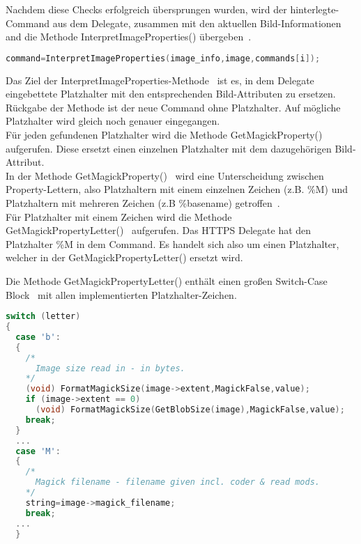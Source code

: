 Nachdem diese Checks erfolgreich übersprungen wurden, wird der hinterlegte-Command aus dem Delegate,
zusammen mit den aktuellen Bild-Informationen and die Methode InterpretImageProperties() übergeben~\cite{CallInterpretImageProperties}.

\begin{lstlisting}[firstnumber=1295, language=C, caption=magick/delegates.c InvokeDelegate() InterpretImageProperties() Aufruf,label={lst:delegatesinterpretcall}]
command=InterpretImageProperties(image_info,image,commands[i]);
\end{lstlisting}
\vspace{5mm}

Das Ziel der InterpretImageProperties-Methode~\cite{DeklarationInterpretImageProperties} ist es, in dem Delegate eingebettete Platzhalter mit den entsprechenden Bild-Attributen zu ersetzen.
Rückgabe der Methode ist der neue Command ohne Platzhalter.
Auf mögliche Platzhalter wird gleich noch genauer eingegangen.\\

Für jeden gefundenen Platzhalter wird die Methode GetMagickProperty()~\cite{CallGetMagickPrioerty} aufgerufen.
Diese ersetzt einen einzelnen Platzhalter mit dem dazugehörigen Bild-Attribut.\\

In der Methode GetMagickProperty()~\cite{DeklarationGetMagickProperty} wird eine Unterscheidung zwischen Property-Lettern,
also Platzhaltern mit einem einzelnen Zeichen (z.B. \%M) und Platzhaltern mit mehreren Zeichen (z.B \%basename) getroffen~\cite{UnterscheidungPropertyLetter}.\\

Für Platzhalter mit einem Zeichen wird die Methode GetMagickPropertyLetter()~\cite{DeklarationGetMgickPropertyLetter} aufgerufen.
Das HTTPS Delegate hat den Platzhalter \%M in dem Command.
Es handelt sich also um einen Platzhalter, welcher in der GetMagickPropertyLetter() ersetzt wird.\\

\newpage

Die Methode GetMagickPropertyLetter() enthält einen großen Switch-Case Block~\cite{SwitchBlock} mit allen implementierten Platzhalter-Zeichen.

\begin{lstlisting}[language=C, caption=magick/property.c GetMagickPropertyLetter Switch über mögliche Platzhalter,label={lst:propertyswitch}]
switch (letter)
{
  case 'b':
  {
    /*
      Image size read in - in bytes.
    */
    (void) FormatMagickSize(image->extent,MagickFalse,value);
    if (image->extent == 0)
      (void) FormatMagickSize(GetBlobSize(image),MagickFalse,value);
    break;
  }
  ...
  case 'M':
  {
    /*
      Magick filename - filename given incl. coder & read mods.
    */
    string=image->magick_filename;
    break;
  ...
  }
\end{lstlisting}
\vspace{5mm}

